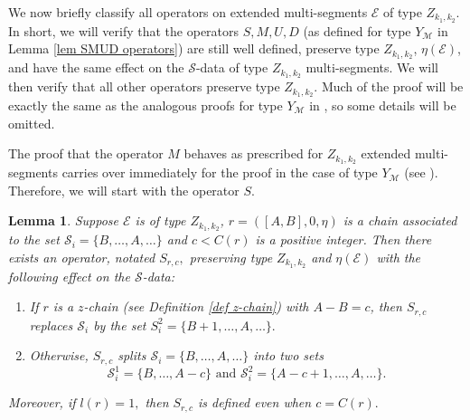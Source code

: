 \documentclass[11pt,letterpaper]{amsart}
\newcommand{\EE}{\mathcal{E}}
\newtheorem{lemma}[thm]{Lemma}
\numberwithin{equation}{section}
\begin{document}
We now briefly classify all operators on extended multi-segments $\mathcal{E}$ of type $Z_{k_1, k_2}.$ In short, we will verify that the operators $S, M, U, D$ (as defined for type $Y_{\mathcal{M}}$ in Lemma \ref{lem SMUD operators}) are still well defined, preserve type $Z_{k_1, k_2}$,  $\eta(\mathcal{E})$, and have the same effect on the $\mathcal{S}$-data of type $Z_{k_1, k_2}$ multi-segments. We will then verify that all other operators preserve type $Z_{k_1, k_2}$. Much of the proof will be exactly the same as the analogous proofs for type $Y_\mathcal{M}$ in \cite[\S 5]{HKT26}, so some details will be omitted. 

The proof that the operator $M$ behaves as prescribed for $Z_{k_1, k_2}$ extended multi-segments carries over immediately for the proof in the case of type $Y_\mathcal{M}$ (see \cite[Lemma 5.33]{HKT26}). Therefore, we will start with the operator $S.$

\begin{lemma}
\label{S existence Z}
    Suppose $\EE$ is of type $Z_{k_1, k_2}$, $r = ([A, B], 0, \eta)$ is a chain associated to the set $\mathcal{S}_i = \{B, \dots, A, \dots\}$ and $c < C(r)$ is a positive integer. Then there exists an operator, notated $S_{r, c},$ preserving type $Z_{k_1, k_2}$ and $\eta(\mathcal{E})$ with the following effect on the $\mathcal{S}$-data:
    \begin{enumerate}
        \item If $r$ is a $z$-chain (see Definition \ref{def z-chain}) with $A - B = c$, then $S_{r, c}$ replaces $\mathcal{S}_i$ by the set $S_i^2 = \{B + 1, \dots, A, \dots\}.$
        \item Otherwise, $S_{r, c}$ splits $\mathcal{S}_i = \{B, \dots, A, \dots\}$ into two sets \[\mathcal{S}_i^1 = \{B, \dots, A - c\} \text{ and } \mathcal{S}_i^2 = \{A - c + 1, \dots, A, \dots\}.\]
    \end{enumerate}
    Moreover, if $l(r) = 1,$ then $S_{r, c}$ is defined even when $c = C(r).$
\end{lemma}
\end{document}
